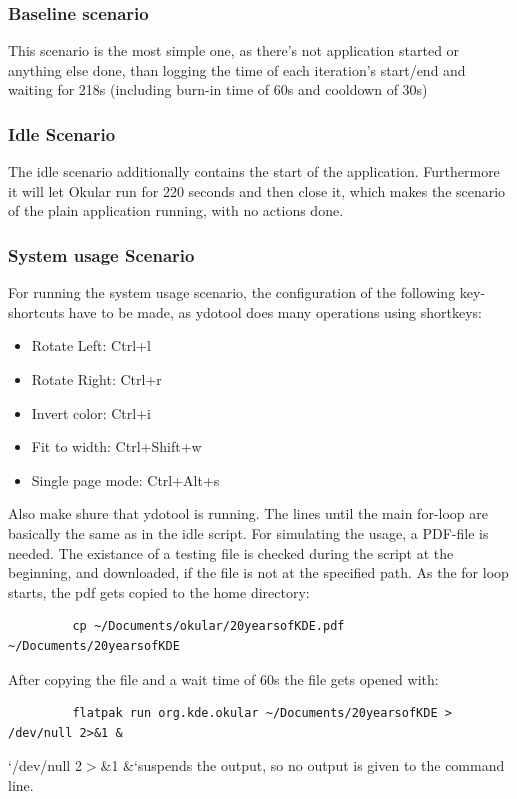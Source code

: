 \documentclass{article}
\begin{document}
        \subsubsection{Baseline scenario}
        This scenario is the most simple one, as there's not application started or anything else done, than logging the time of each iteration's start/end and waiting for 218s (including burn-in time of 60s and cooldown of 30s)
        \subsubsection{Idle Scenario}
        The idle scenario additionally contains the start of the application. Furthermore it will let Okular run for 220 seconds and then close it, which makes the scenario of the plain application running, with no actions done.
        \subsubsection{System usage Scenario}
        For running the system usage scenario, the configuration of the following key-shortcuts have to be made, as ydotool does many operations using shortkeys:
        \begin{itemize}
         \item Rotate Left: Ctrl+l
         \item Rotate Right: Ctrl+r
         \item Invert color: Ctrl+i
         \item Fit to width: Ctrl+Shift+w
         \item Single page mode: Ctrl+Alt+s
        \end{itemize}
        Also make shure that ydotool is running.
        The lines until the main for-loop are basically the same as in the idle script. For simulating the usage, a PDF-file is needed. The existance of a testing file is checked during the script at the beginning, and downloaded, if the file is not at the specified path. As the for loop starts, the pdf gets copied to the home directory:
        \begin{lstlisting}
         cp ~/Documents/okular/20yearsofKDE.pdf ~/Documents/20yearsofKDE
        \end{lstlisting}
        After copying the file and a wait time of 60s the file gets opened with:
        \begin{lstlisting}
         flatpak run org.kde.okular ~/Documents/20yearsofKDE > /dev/null 2>&1 &
        \end{lstlisting}
        `/dev/null 2$>$\&1 \&`suspends the output, so no output is given to the command line.
\end{document}
